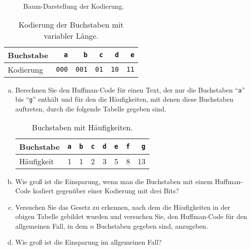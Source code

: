 \begin{figure}[!ht]
  \centering
  \caption{Baum-Darstellung der Kodierung.}
  \label{fig:coding-tree2}
\end{figure}



\begin{table}[htbp]
  \centering
\begin{tabular}[t]{|l|r|r|r|r|r|}
\hline
Buchstabe &   \texttt{a} &   \texttt{b} & \texttt{c}  & \texttt{d}  & \texttt{e}   \\
\hline
\hline
Kodierung & \texttt{000} & \texttt{001} & \texttt{01} & \texttt{10} & \texttt{11} \\
\hline
\end{tabular}
  \caption{Kodierung der Buchstaben mit variabler L\"ange.}
  \label{tab:coding2}
\end{table}


\exercise
\begin{enumerate}[(a)]
\item Berechnen Sie den Huffman-Code f\"ur einen Text, der nur die Buchstaben
      ``\texttt{a}'' bis ``\texttt{g}'' enth\"alt und f\"ur den die H\"aufigkeiten,
      mit denen diese Buchstaben auftreten, durch die folgende Tabelle gegeben sind.

\begin{table}[htbp]
  \centering
\begin{tabular}[t]{|l|r|r|r|r|r|r|r|}
\hline
Buchstabe  & \texttt{a} & \texttt{b} & \texttt{c} & \texttt{d} & \texttt{e} & \texttt{f} & \texttt{g} \\
\hline
\hline
H\"aufigkeit &          1 &          1 &          2 &          3 &          5 &         8 &         13 \\
\hline
\end{tabular}
  \caption{Buchstaben mit H\"aufigkeiten.}
  \label{tab:aufgabe-huffman}
\end{table}

\item Wie gro{\ss} ist die Einsparung, wenn man die Buchstaben mit einem Huffman-Code
      kodiert gegen\"uber einer Kodierung mit drei Bits?
\item Versuchen Sie das Gesetz zu erkennen, nach dem die H\"aufigkeiten in der obigen Tabelle 
      gebildet wurden und versuchen Sie, den Huffman-Code f\"ur den allgemeinen Fall,
      in dem $n$ Buchstaben gegeben sind, anzugeben.
\item Wie gro{\ss} ist die Einsparung im allgemeinen Fall?
\end{enumerate}


